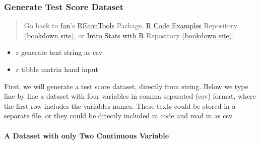 \documentclass[
]{book}
\providecommand{\tightlist}{%
  \setlength{\itemsep}{0pt}\setlength{\parskip}{0pt}}
\begin{document}
\hypertarget{generate-test-score-dataset}{%
\subsubsection{Generate Test Score Dataset}\label{generate-test-score-dataset}}

\begin{quote}
Go back to \href{http://fanwangecon.github.io/}{fan}'s \href{https://fanwangecon.github.io/REconTools/}{REconTools} Package, \href{https://fanwangecon.github.io/R4Econ/}{R Code Examples} Repository (\href{https://fanwangecon.github.io/R4Econ/bookdown}{bookdown site}), or \href{https://fanwangecon.github.io/Stat4Econ/}{Intro Stats with R} Repository (\href{https://fanwangecon.github.io/Stat4Econ/bookdown}{bookdown site}).
\end{quote}

\begin{itemize}
\tightlist
\item
  r generate text string as csv
\item
  r tibble matrix hand input
\end{itemize}

First, we will generate a test score dataset, directly from string. Below we type line by line a dataset with four variables in comma separated (csv) format, where the first row includes the variables names. These texts could be stored in a separate file, or they could be directly included in code and read in as csv

\hypertarget{a-dataset-with-only-two-continuous-variable}{%
\paragraph{A Dataset with only Two Continuous Variable}\label{a-dataset-with-only-two-continuous-variable}}
\end{document}
